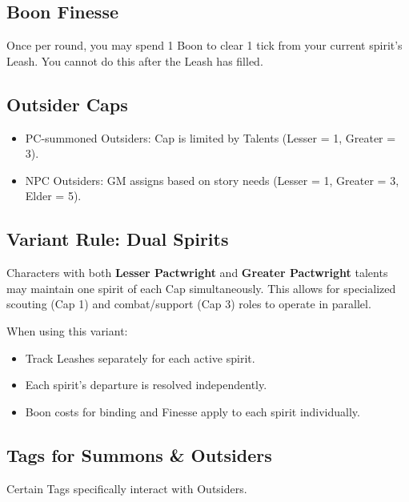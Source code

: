 \subsection{Boon Finesse}
Once per round, you may spend 1 Boon to clear 1 tick from your current spirit's Leash. You cannot do this after the Leash has filled.

\subsection{Outsider Caps}
\begin{itemize}
  \item PC-summoned Outsiders: Cap is limited by Talents (Lesser = 1, Greater = 3).
  \item NPC Outsiders: GM assigns based on story needs (Lesser = 1, Greater = 3, Elder = 5).
\end{itemize}

\subsection{Variant Rule: Dual Spirits}
Characters with both \textbf{Lesser Pactwright} and \textbf{Greater Pactwright} talents may maintain one spirit of each Cap simultaneously. This allows for specialized scouting (Cap 1) and combat/support (Cap 3) roles to operate in parallel.

When using this variant:
\begin{itemize}
  \item Track Leashes separately for each active spirit.
  \item Each spirit's departure is resolved independently.
  \item Boon costs for binding and Finesse apply to each spirit individually.
\end{itemize}

\subsection{Tags for Summons \& Outsiders}
Certain Tags specifically interact with Outsiders.

